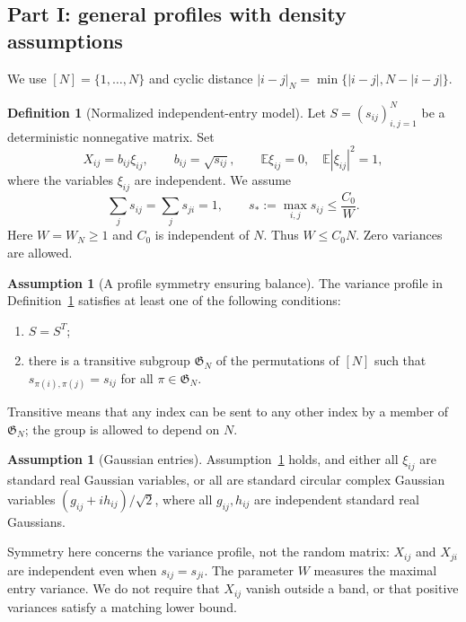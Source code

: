 \documentclass[11pt,reqno]{amsart}
\numberwithin{equation}{section}
\theoremstyle{plain}
\theoremstyle{definition}
\newtheorem{definition}[theorem]{Definition}
\newtheorem{assumption}[theorem]{Assumption}
\theoremstyle{remark}
\begin{document}
\subsection{Part I: general profiles with density assumptions}
\label{subsec:general-main}
We use $[N]=\{1,\ldots,N\}$ and cyclic distance
$|i-j|_N=\min\{|i-j|,N-|i-j|\}$.

\begin{definition}[Normalized independent-entry model]\label{mainassumptionbands}
Let $S=(s_{ij})_{i,j=1}^N$ be a deterministic nonnegative matrix. Set
\[
 X_{ij}=b_{ij}\xi_{ij},\qquad b_{ij}=\sqrt{s_{ij}},
 \qquad \mathbb E\xi_{ij}=0,\quad \mathbb E|\xi_{ij}|^2=1,
\]
where the variables $\xi_{ij}$ are independent. We assume
\begin{equation}\label{eq:normalized-profile}
 \sum_j s_{ij}=\sum_j s_{ji}=1,\qquad
 s_*:=\max_{i,j}s_{ij}\leq \frac{C_0}{W}.
\end{equation}
Here $W=W_N\geq1$ and $C_0$ is independent of $N$. Thus
$W\leq C_0N$. Zero variances are allowed. 
\end{definition}

\begin{assumption}[A profile symmetry ensuring balance]\label{ass:profile-balance}
The variance profile in Definition~\ref{mainassumptionbands} satisfies at
least one of the following conditions:
\begin{enumerate}[label=\textup{(\roman*)}]
\item $S=S^T$;
\item there is a transitive subgroup $\mathfrak G_N$ of the permutations
of $[N]$ such that $s_{\pi(i),\pi(j)}=s_{ij}$ for all $\pi\in\mathfrak G_N$.
\end{enumerate}
Transitive means that any index can be sent to any other index by a member
of $\mathfrak G_N$; the group is allowed to depend on $N$.
\end{assumption}

\begin{assumption}[Gaussian entries]\label{ass:gaussian}
Assumption~\ref{ass:profile-balance} holds, and either
all $\xi_{ij}$ are standard real Gaussian variables, or all are standard
circular complex Gaussian variables $(g_{ij}+ih_{ij})/\sqrt2$, where all
$g_{ij},h_{ij}$ are independent standard real Gaussians.
\end{assumption}

Symmetry here concerns the variance profile, not the random matrix:
$X_{ij}$ and $X_{ji}$ are independent even when $s_{ij}=s_{ji}$.
The parameter $W$ measures the maximal entry variance. We do not require
that $X_{ij}$ vanish outside a band, or that positive variances satisfy a
matching lower bound.
\end{document}
